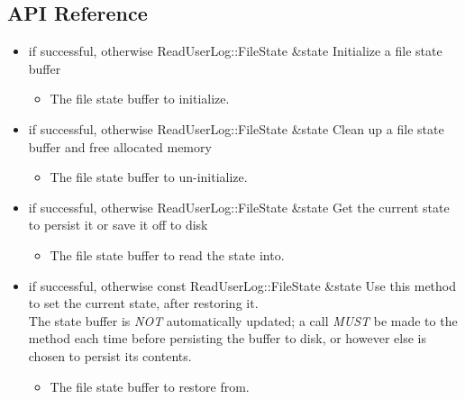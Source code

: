 \subsection{API Reference}
\begin{itemize}

\item {}
  {} { if successful,  otherwise}
  {ReadUserLog::FileState \&state}
  {Initialize a file state buffer}
  \begin{itemize}
  \item {}
    The file state buffer to initialize.
  \end{itemize}

\item {}
  {} { if successful,  otherwise}
  {ReadUserLog::FileState \&state}
  {Clean up a file state buffer and free allocated memory}
  \begin{itemize}
  \item {}
    The file state buffer to un-initialize.
  \end{itemize}

\item {}
  {} { if successful,  otherwise}
  {ReadUserLog::FileState \&state}
  {Get the current state to persist it or save it off to disk}
  \begin{itemize}
  \item {}
    The file state buffer to read the state into.
  \end{itemize}

\item {}
  {} { if successful,  otherwise}
  {const ReadUserLog::FileState \&state}
  {Use this method to set the current state, after restoring it.
    \\ \Note The state buffer is \emph{NOT} automatically updated; a call 
    \emph{MUST} be made to
    the  method each time before persisting the
    buffer to disk, or however else is chosen to persist its contents.}
  \begin{itemize}
  \item {}
    The file state buffer to restore from.
  \end{itemize}

\end{itemize}

